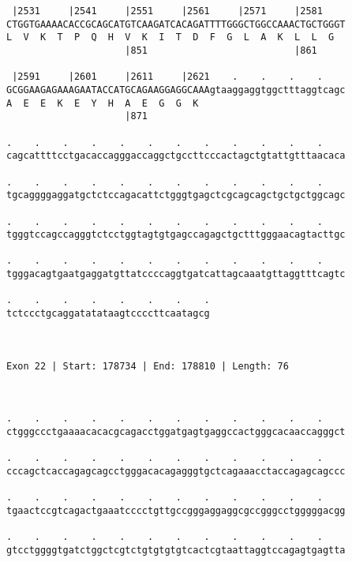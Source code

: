 \documentclass{article}
\begin{document}
\begin{Verbatim}
 |2531     |2541     |2551     |2561     |2571     |2581    
CTGGTGAAAACACCGCAGCATGTCAAGATCACAGATTTTGGGCTGGCCAAACTGCTGGGT
L  V  K  T  P  Q  H  V  K  I  T  D  F  G  L  A  K  L  L  G  
                     |851                          |861     
  
 |2591     |2601     |2611     |2621    .    .    .    .    
GCGGAAGAGAAAGAATACCATGCAGAAGGAGGCAAAgtaaggaggtggctttaggtcagc
A  E  E  K  E  Y  H  A  E  G  G  K                          
                     |871                                   
  
.    .    .    .    .    .    .    .    .    .    .    .    
cagcattttcctgacaccagggaccaggctgccttcccactagctgtattgtttaacaca
                                                            
.    .    .    .    .    .    .    .    .    .    .    .    
tgcaggggaggatgctctccagacattctgggtgagctcgcagcagctgctgctggcagc
                                                            
.    .    .    .    .    .    .    .    .    .    .    .    
tgggtccagccagggtctcctggtagtgtgagccagagctgctttgggaacagtacttgc
                                                            
.    .    .    .    .    .    .    .    .    .    .    .    
tgggacagtgaatgaggatgttatccccaggtgatcattagcaaatgttaggtttcagtc
                                                            
.    .    .    .    .    .    .    .
tctccctgcaggatatataagtccccttcaatagcg
                                    
                                    
 
Exon 22 | Start: 178734 | End: 178810 | Length: 76



.    .    .    .    .    .    .    .    .    .    .    .    
ctgggccctgaaaacacacgcagacctggatgagtgaggccactgggcacaaccagggct
                                                            
.    .    .    .    .    .    .    .    .    .    .    .    
cccagctcaccagagcagcctgggacacagagggtgctcagaaacctaccagagcagccc
                                                            
.    .    .    .    .    .    .    .    .    .    .    .    
tgaactccgtcagactgaaatcccctgttgccgggaggaggcgccgggcctgggggacgg
                                                            
.    .    .    .    .    .    .    .    .    .    .    .    
gtcctggggtgatctggctcgtctgtgtgtgtcactcgtaattaggtccagagtgagtta
                                                            

\end{Verbatim}
\end{document}
